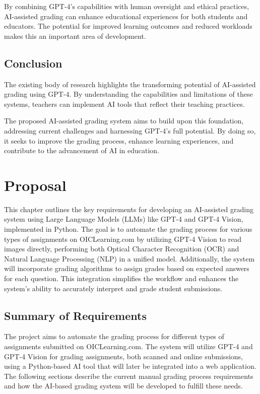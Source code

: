 \documentclass[ms,twoside,print]{nuthesis}
\begin{document}
By combining GPT-4's capabilities with human oversight and ethical practices, AI-assisted grading can enhance educational experiences for both students and educators. The potential for improved learning outcomes and reduced workloads makes this an important area of development.

\section{Conclusion}

The existing body of research highlights the transforming potential of AI-assisted grading using GPT-4. By understanding the capabilities and limitations of these systems, teachers can implement AI tools that reflect their teaching practices.

The proposed AI-assisted grading system aims to build upon this foundation, addressing current challenges and harnessing GPT-4's full potential. By doing so, it seeks to improve the grading process, enhance learning experiences, and contribute to the advancement of AI in education.

\chapter{Proposal}

This chapter outlines the key requirements for developing an AI-assisted grading system using Large Language Models (LLMs) like GPT-4 and GPT-4 Vision, implemented in Python. The goal is to automate the grading process for various types of assignments on OICLearning.com by utilizing GPT-4 Vision to read images directly, performing both Optical Character Recognition (OCR) and Natural Language Processing (NLP) in a unified model. Additionally, the system will incorporate grading algorithms to assign grades based on expected answers for each question. This integration simplifies the workflow and enhances the system's ability to accurately interpret and grade student submissions.

\section{Summary of Requirements}

The project aims to automate the grading process for different types of assignments submitted on OICLearning.com. The system will utilize GPT-4 and GPT-4 Vision for grading assignments, both scanned and online submissions, using a Python-based AI tool that will later be integrated into a web application. The following sections describe the current manual grading process requirements and how the AI-based grading system will be developed to fulfill these needs.
\end{document}
